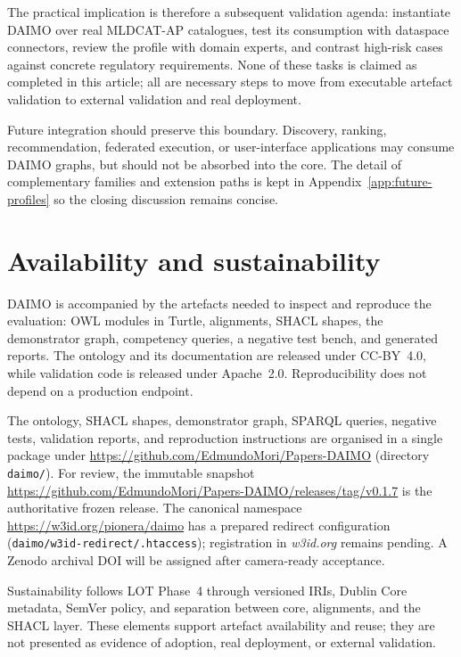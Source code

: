 \documentclass[Afour,sagev,times]{sagej}
\newcommand{\code}[1]{\texttt{#1}}
\begin{document}
The practical implication is therefore a subsequent validation agenda: instantiate DAIMO over real MLDCAT-AP catalogues, test its consumption with dataspace connectors, review the profile with domain experts, and contrast high-risk cases against concrete regulatory requirements. None of these tasks is claimed as completed in this article; all are necessary steps to move from executable artefact validation to external validation and real deployment.

Future integration should preserve this boundary. Discovery, ranking, recommendation, federated execution, or user-interface applications may consume DAIMO graphs, but should not be absorbed into the core. The detail of complementary families and extension paths is kept in Appendix~\ref{app:future-profiles} so the closing discussion remains concise.

\section{Availability and sustainability}\label{sec:avail}

DAIMO is accompanied by the artefacts needed to inspect and reproduce the evaluation: OWL modules in Turtle, alignments, SHACL shapes, the demonstrator graph, competency queries, a negative test bench, and generated reports. The ontology and its documentation are released under CC-BY~4.0, while validation code is released under Apache~2.0. Reproducibility does not depend on a production endpoint.

The ontology, SHACL shapes, demonstrator graph, SPARQL queries, negative tests, validation reports, and reproduction instructions are organised in a single package under \url{https://github.com/EdmundoMori/Papers-DAIMO} (directory \code{daimo/}). For review, the immutable snapshot \url{https://github.com/EdmundoMori/Papers-DAIMO/releases/tag/v0.1.7} is the authoritative frozen release. The canonical namespace \url{https://w3id.org/pionera/daimo} has a prepared redirect configuration (\code{daimo/w3id-redirect/.htaccess}); registration in \emph{w3id.org} remains pending. A Zenodo archival DOI will be assigned after camera-ready acceptance.

Sustainability follows LOT Phase~4 through versioned IRIs, Dublin Core metadata, SemVer policy, and separation between core, alignments, and the SHACL layer. These elements support artefact availability and reuse; they are not presented as evidence of adoption, real deployment, or external validation.
\end{document}
